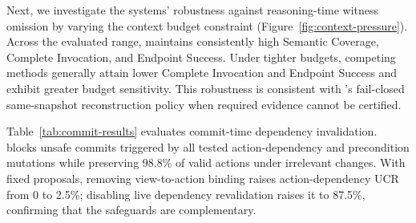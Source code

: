 Next, we investigate the systems' robustness against reasoning-time witness omission by varying the context budget constraint
(Figure~\ref{fig:context-pressure}).
Across the evaluated range, \method{} maintains consistently high Semantic Coverage, Complete Invocation, and Endpoint Success. Under tighter budgets, competing methods generally attain lower Complete Invocation and Endpoint Success and exhibit greater budget sensitivity. This robustness is consistent with \method{}'s fail-closed same-snapshot reconstruction policy when required evidence cannot be certified.
\begin{table}[tb]
    \centering
    \footnotesize
    \setlength{\tabcolsep}{4pt}
    \caption{CDI commit-time authorization safety and valid-action preservation; latency is in-process gate-only p50/p95.}
    \label{tab:commit-results}
\end{table}
Table~\ref{tab:commit-results} evaluates commit-time dependency invalidation.
\method{} blocks unsafe commits triggered by all tested action-dependency and precondition mutations while preserving 98.8\% of valid actions under irrelevant changes.
With fixed proposals, removing view-to-action binding raises action-dependency UCR from 0 to 2.5\%; disabling live dependency revalidation raises it to 87.5\%, confirming that the safeguards are complementary.
